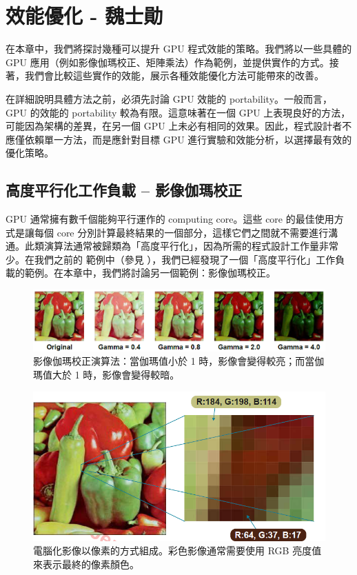 \chapter{ 效能優化 - 魏士勛} \label{chap:hip_optimization}
在本章中，我們將探討幾種可以提升 GPU 程式效能的策略。我們將以一些具體的 GPU 應用（例如影像伽瑪校正、矩陣乘法）作為範例，並提供實作的方式。接著，我們會比較這些實作的效能，展示各種效能優化方法可能帶來的改善。

在詳細說明具體方法之前，必須先討論 GPU 效能的 portability。一般而言，GPU 的效能的 portability 較為有限。這意味著在一個 GPU 上表現良好的方法，可能因為架構的差異，在另一個 GPU 上未必有相同的效果。因此，程式設計者不應僅依賴單一方法，而是應針對目標 GPU 進行實驗和效能分析，以選擇最有效的優化策略。

\section{高度平行化工作負載 – 影像伽瑪校正}
\label{sec:gamma_correction}
GPU 通常擁有數千個能夠平行運作的 computing core。這些 core 的最佳使用方式是讓每個 core 分別計算最終結果的一個部分，這樣它們之間就不需要進行溝通。此類演算法通常被歸類為「高度平行化」，因為所需的程式設計工作量非常少。在我們之前的  範例中（參見 ），我們已經發現了一個「高度平行化」工作負載的範例。在本章中，我們將討論另一個範例：影像伽瑪校正。

\begin{figure}
    \centering
    \includegraphics[width=1\linewidth]{FileAusiliari/Screenshots/Figure8-1.png}
    \caption{影像伽瑪校正演算法：當伽瑪值小於 1 時，影像會變得較亮；而當伽瑪值大於 1 時，影像會變得較暗。}
    \label{fig:gamma}
\end{figure}

\begin{figure}
    \centering
    \includegraphics[width=0.9\linewidth]{FileAusiliari/Screenshots/Figure8-2.png}
    \caption{電腦化影像以像素的方式組成。彩色影像通常需要使用 RGB 亮度值來表示最終的像素顏色。}
    \label{fig:RGB}
\end{figure}


